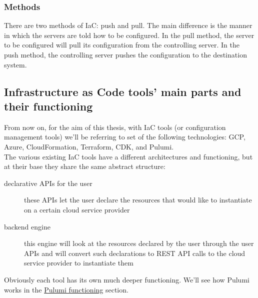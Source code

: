 \subsubsection{Methods}

There are two methods of IaC: push and pull.
The main difference is the manner in which the servers are told how to be configured.
In the pull method, the server to be configured will pull its configuration from the controlling server.
In the push method, the controlling server pushes the configuration to the destination system.

\subsection{Infrastructure as Code tools' main parts and their functioning}
From now on, for the aim of this thesis, with IaC tools (or configuration management tools) we'll be referring to set of the following technologies: \gls{GCP}, \gls{Azure}, \gls{CloudFormation}, \gls{Terraform}, \gls{CDK}, and Pulumi.\\
The various existing IaC tools have a different architectures and functioning, but at their base they share the same abstract structure:
\begin{description}
  \item[declarative APIs for the user] these APIs let the user declare the resources that would like to instantiate on a certain cloud service provider
  \item[backend engine] this engine will look at the resources declared by the user through the user APIs and will convert such declarations to REST API calls to the cloud service provider to instantiate them 
\end{description}
Obviously each tool has its own much deeper functioning.
We'll see how Pulumi works in the \hyperref[sec:pulumi-functioning]{Pulumi functioning} section.



